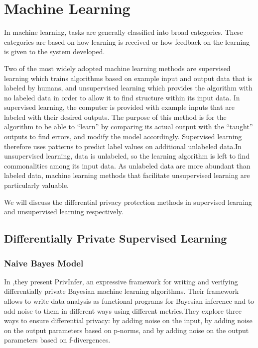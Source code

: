 \documentclass[10pt,conference]{IEEEtran}
\begin{document}
\section{Machine Learning}
In machine learning, tasks are generally classified into broad categories. These categories are based on how learning is received or how feedback on the learning is given to the system developed.

Two of the most widely adopted machine learning methods are supervised learning which trains algorithms based on example input and output data that is labeled by humans, and unsupervised learning which provides the algorithm with no labeled data in order to allow it to find structure within its input data. In supervised learning, the computer is provided with example inputs that are labeled with their desired outputs. The purpose of this method is for the algorithm to be able to “learn” by comparing its actual output with the “taught” outputs to find errors, and modify the model accordingly. Supervised learning therefore uses patterns to predict label values on additional unlabeled data.In unsupervised learning, data is unlabeled, so the learning algorithm is left to find commonalities among its input data. As unlabeled data are more abundant than labeled data, machine learning methods that facilitate unsupervised learning are particularly valuable.

We will discuss the differential privacy protection methods in supervised learning and unsupervised learning respectively.




\subsection{Differentially Private Supervised Learning
}

\subsubsection{Naive Bayes Model}

In \cite{Barthe2016Differentially},they present PrivInfer, an expressive framework for writing and verifying differentially private Bayesian machine learning algorithms. Their framework allows to write data analysis as functional programs for Bayesian inference and to add noise to them in different ways using different metrics.They explore three ways to ensure differential privacy: by adding noise on the input, by adding noise on the output parameters based on p-norms, and by adding noise on the output parameters based on f-divergences.
\end{document}
